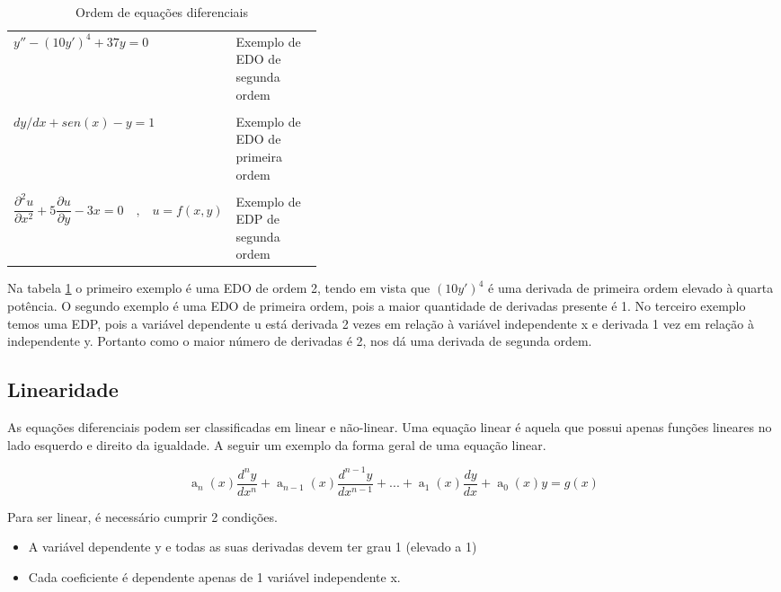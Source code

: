 \begin{center}
\begin{table}[h!]
\centering
\begin{tabular}{l  p{0.4\linewidth}}

\toprule
$  y'' - (10y')^4 + 37y = 0  $ & Exemplo de EDO de segunda ordem \\
\\
$ dy/dx + sen(x) - y = 1 $ & Exemplo de EDO de primeira ordem \\ 
\\
 $
\dfrac{\partial^2u}{\partial x^2} + 5 \dfrac{\partial u}{\partial y} - 3x = 0 \quad \textrm{,} \quad   u = f(x,y)
$
 &  
 Exemplo de EDP de segunda ordem 
 \\
 
\bottomrule


\end{tabular}
\caption{Ordem de equações diferenciais}
\label{tabelaOrdem}
\end{table}
\end{center}

Na tabela \ref{tabelaOrdem} o primeiro exemplo é uma EDO de ordem 2, tendo em vista que $(10y')^4$ é uma derivada de primeira ordem elevado à quarta potência.
O segundo exemplo é uma EDO de primeira ordem, pois a maior quantidade de derivadas presente é 1.
No terceiro exemplo temos uma EDP, pois a variável dependente u está derivada 2 vezes em relação à variável independente x e derivada 1 vez em relação à independente y. Portanto como o maior número de derivadas é 2, nos dá uma derivada de segunda ordem.

\subsection[Linearidade]{Linearidade}
As equações diferenciais podem ser classificadas em linear e não-linear.
Uma equação linear é aquela que possui apenas funções lineares no lado esquerdo e direito da igualdade. A seguir um exemplo da forma geral de uma equação linear.
\begin{center}
\begin{equation} \label{formaGeral}
 \operatorname{a}_{n}(x) \dfrac{d^ny}{dx^n} + \operatorname{a}_{n-1}(x)\dfrac{d^{n-1}y}{dx^{n-1}} + ... + \operatorname{a}_{1}(x)\dfrac{dy}{dx} + \operatorname{a}_{0}(x)y = g(x) 
\end{equation}
\end{center}

Para ser linear, é necessário cumprir 2 condições. 
\begin{itemize}
	\item{}A variável dependente y e todas as suas derivadas devem ter grau 1 (elevado a 1)
	\item{}Cada coeficiente é dependente apenas de 1 variável independente x.
\end{itemize}

